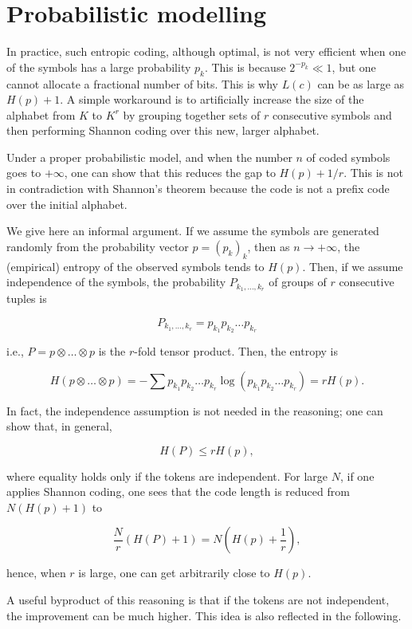 \section{Probabilistic modelling}

In practice, such entropic coding, although optimal, is not very efficient when one of the symbols has a large probability $p_k$. This is because $2^{-p_k} \ll 1$, but one cannot allocate a fractional number of bits. This is why $L(c)$ can be as large as $H(p) + 1$. A simple workaround is to artificially increase the size of the alphabet from $K$ to $K^r$ by grouping together sets of $r$ consecutive symbols and then performing Shannon coding over this new, larger alphabet.

Under a proper probabilistic model, and when the number $n$ of coded symbols goes to $+\infty$, one can show that this reduces the gap to $H(p) + 1/r$. This is not in contradiction with Shannon's theorem because the code is not a prefix code over the initial alphabet.

We give here an informal argument. If we assume the symbols are generated randomly from the probability vector $p = (p_k)_k$, then as $n \to +\infty$, the (empirical) entropy of the observed symbols tends to $H(p)$. Then, if we assume independence of the symbols, the probability $P_{k_1, \ldots, k_r}$ of groups of $r$ consecutive tuples is 

\[
P_{k_1, \ldots, k_r} = p_{k_1} p_{k_2} \ldots p_{k_r}
\]

i.e., $P = p \otimes \ldots \otimes p$ is the $r$-fold tensor product. Then, the entropy is 

\[
H(p \otimes \ldots \otimes p) = -\sum p_{k_1} p_{k_2} \ldots p_{k_r} \log( p_{k_1} p_{k_2} \ldots p_{k_r} ) = r H(p).
\]

In fact, the independence assumption is not needed in the reasoning; one can show that, in general,

\[
H(P) \leq r H(p),
\]

where equality holds only if the tokens are independent. For large $N$, if one applies Shannon coding, one sees that the code length is reduced from $N (H(p) + 1)$ to 

\[
\frac{N}{r} ( H(P) + 1 ) = N \left( H(p) + \frac{1}{r} \right),
\]

hence, when $r$ is large, one can get arbitrarily close to $H(p)$.

A useful byproduct of this reasoning is that if the tokens are not independent, the improvement can be much higher. This idea is also reflected in the following.


